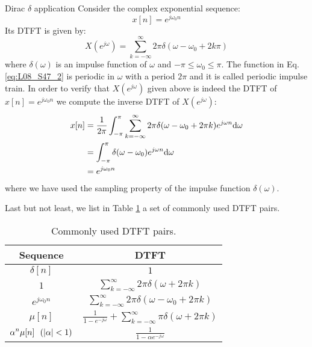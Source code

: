 \documentclass[../../main/main.tex]{subfiles}
\begin{document}
\begin{example}{Dirac \( \delta \) application}
    Consider the complex exponential sequence:
    \begin{equation}
        x[n]
        =
        e^{j\omega_{0}n}
        \label{eq:L08_S47_1}
    \end{equation}
    Its DTFT is given by:
    \begin{equation}
        X(e^{j\omega})
        =
        \sum_{k=-\infty}^{\infty} 2\pi \delta(\omega - \omega_{0} + 2k\pi)
        \label{eq:L08_S47_2}
    \end{equation}
    where \( \delta(\omega) \) is an impulse function of \( \omega \) and \( -\pi \le \omega_{0} \le \pi \). The function in Eq. \ref{eq:L08_S47_2} is periodic in \( \omega \) with a period \( 2\pi \) and it is called periodic impulse train.
    In order to verify that \( X(e^{j\omega}) \) given above is indeed the DTFT of \( x[n] = e^{j\omega_{0}n} \) we compute the inverse DTFT of \( X(e^{j\omega}) \):
    \begin{align}
        x[n]
        &=
            \frac{1}{2\pi} \int_{-\pi}^{\pi} \sum_{k=-\infty}^{\infty} 2\pi \delta(\omega - \omega_{0} + 2\pi k) e^{j\omega n} \mathrm{d}{\omega}   \nonumber   \\
        &=
            \int_{-\pi}^{\pi} \delta(\omega - \omega_{0}) e^{j\omega n} \mathrm{d}{\omega}  \nonumber   \\
        &=
            e^{j\omega_{0}n}
    \end{align}
    where we have used the sampling property of the impulse function \( \delta(\omega) \).
\end{example}

Last but not least, we list in Table \ref{tab:L08_S50_1} a set of commonly used DTFT pairs.

\begin{table}[!h]
    \centering
    \begin{tabular}{cc}
        \toprule
        \textbf{Sequence}   &   \textbf{DTFT}   \\
        \midrule
        \( \displaystyle \delta[n] \) &   \( \displaystyle 1 \) \\
        \( \displaystyle 1 \)   &   \( \displaystyle \sum_{k=-\infty}^{\infty} 2\pi \delta(\omega + 2\pi k) \)  \\
        \( \displaystyle e^{j\omega_{0}n} \)    &   \( \displaystyle \sum_{k=-\infty}^{\infty} 2\pi \delta(\omega - \omega_{0} + 2\pi k) \) \\
        \( \displaystyle \mu[n] \)  &   \( \displaystyle \frac{1}{1 - e^{-j\omega}} + \sum_{k=-\infty}^{\infty} \pi \delta(\omega + 2\pi k) \)  \\
        \( \displaystyle \alpha^{n}\mu[n] \ \ (\abs{\alpha} < 1 ) \)    &   \( \displaystyle \frac{1}{1 - \alpha e^{-j \omega}} \)  \\
        \bottomrule
    \end{tabular}
    \caption{\label{tab:L08_S50_1} Commonly used DTFT pairs.}
\end{table}
\end{document}
